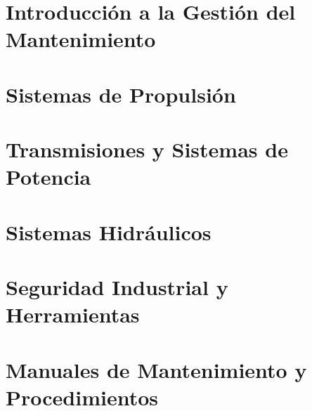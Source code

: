 \documentclass[a4paper,12pt]{book}
\begin{document}
\maketitle

\tableofcontents

\chapter{Introducción a la Gestión del Mantenimiento}


\chapter{Sistemas de Propulsión}


\chapter{Transmisiones y Sistemas de Potencia}


\chapter{Sistemas Hidráulicos}


\chapter{Seguridad Industrial y Herramientas}


\chapter{Manuales de Mantenimiento y Procedimientos}

\end{document}
